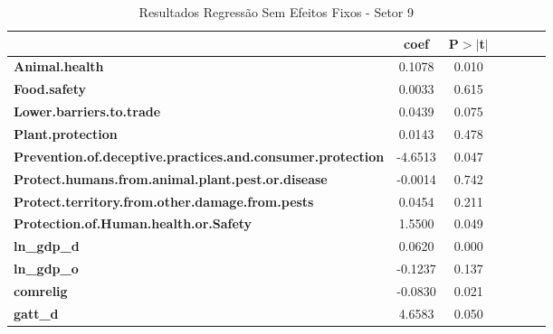 \begin{table}[ht]
    \begin{center}
        \begin{tabular}{lcccccc}
            & \textbf{coef} & \textbf{P$> |$t$|$}\\
            \midrule
\textbf{Animal.health}                                             &       0.1078  &         0.010   \\
\textbf{Food.safety}                                               &       0.0033  &         0.615   \\
\textbf{Lower.barriers.to.trade}                                   &       0.0439  &         0.075   \\
\textbf{Plant.protection}                                          &       0.0143  &         0.478   \\
\textbf{Prevention.of.deceptive.practices.and.consumer.protection} &      -4.6513  &         0.047   \\
\textbf{Protect.humans.from.animal.plant.pest.or.disease}          &      -0.0014  &         0.742   \\
\textbf{Protect.territory.from.other.damage.from.pests}            &       0.0454  &         0.211   \\
\textbf{Protection.of.Human.health.or.Safety}                      &       1.5500  &         0.049   \\
\textbf{ln\_gdp\_d}                                                &       0.0620  &         0.000   \\
\textbf{ln\_gdp\_o}                                                &      -0.1237  &         0.137   \\
\textbf{comrelig}                                                  &      -0.0830  &         0.021   \\
\textbf{gatt\_d}                                                   &       4.6583  &         0.050   \\
\bottomrule
\end{tabular}
\caption{Resultados Regressão Sem Efeitos Fixos - Setor 9}
\end{center}
\end{table}